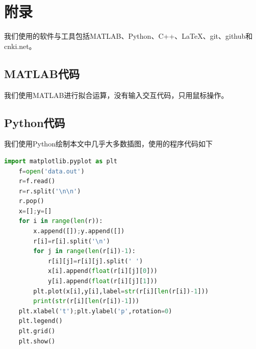 \documentclass[12pt,AutoFakeBold]{article}%
\begin{document}
    \newpage
    \pagestyle{empty}
    \section{附录}
    我们使用的软件与工具包括MATLAB、Python、C++、\LaTeX、git、github和cnki.net。
    \subsection{MATLAB代码}
    我们使用MATLAB进行拟合运算，没有输入交互代码，只用鼠标操作。
    \subsection{Python代码}
    我们使用Python绘制本文中几乎大多数插图，使用的程序代码如下
    \begin{lstlisting}[language={python}]
    import matplotlib.pyplot as plt
    f=open('data.out')
    r=f.read()
    r=r.split('\n\n')
    r.pop()
    x=[];y=[]
    for i in range(len(r)):
        x.append([]);y.append([])
        r[i]=r[i].split('\n')
        for j in range(len(r[i])-1):
            r[i][j]=r[i][j].split(' ')
            x[i].append(float(r[i][j][0]))
            y[i].append(float(r[i][j][1]))
        plt.plot(x[i],y[i],label=str(r[i][len(r[i])-1]))
        print(str(r[i][len(r[i])-1]))
    plt.xlabel('t');plt.ylabel('p',rotation=0)
    plt.legend()
    plt.grid()
    plt.show()
    \end{lstlisting}
\end{document}
